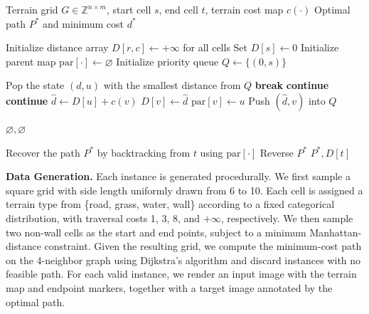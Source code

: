 \begin{algorithm}[t]
\caption{Verification via Dijkstra Search}
\label{alg:dijkstra_verify}
\begin{algorithmic}[1]
\Require Terrain grid \(G \in \mathbb{Z}^{n \times m}\), start cell \(s\), end cell \(t\), terrain cost map \(c(\cdot)\)
\Ensure Optimal path \(P^*\) and minimum cost \(d^*\)

\State Initialize distance array \(D[r,c] \leftarrow +\infty\) for all cells
\State Set \(D[s] \leftarrow 0\)
\State Initialize parent map \(\mathrm{par}[\cdot] \leftarrow \varnothing\)
\State Initialize priority queue \(Q \leftarrow \{(0, s)\}\)

    \State Pop the state \((d, u)\) with the smallest distance from \(Q\)
        \State \textbf{break}
    \EndIf
        \State \textbf{continue}
    \EndIf
            \State \textbf{continue}
        \EndIf
        \State \(\hat{d} \leftarrow D[u] + c(v)\)
            \State \(D[v] \leftarrow \hat{d}\)
            \State \(\mathrm{par}[v] \leftarrow u\)
            \State Push \((\hat{d}, v)\) into \(Q\)
        \EndIf
    \EndFor
\EndWhile

    \State \Return \(\varnothing, \varnothing\)
\EndIf

\State Recover the path \(P^*\) by backtracking from \(t\) using \(\mathrm{par}[\cdot]\)
\State Reverse \(P^*\)
\State \Return \(P^*, D[t]\)
\end{algorithmic}
\end{algorithm}

\textbf{Data Generation.}
Each instance is generated procedurally. We first sample a square grid with
side length uniformly drawn from 6 to 10. Each cell is assigned a terrain type
from \{road, grass, water, wall\} according to a fixed categorical
distribution, with traversal costs 1, 3, 8, and \(+\infty\), respectively. We
then sample two non-wall cells as the start and end points, subject to a
minimum Manhattan-distance constraint. Given the resulting grid, we compute the
minimum-cost path on the 4-neighbor graph using Dijkstra's algorithm and
discard instances with no feasible path. For each valid instance, we render an
input image with the terrain map and endpoint markers, together with a target
image annotated by the optimal path.

